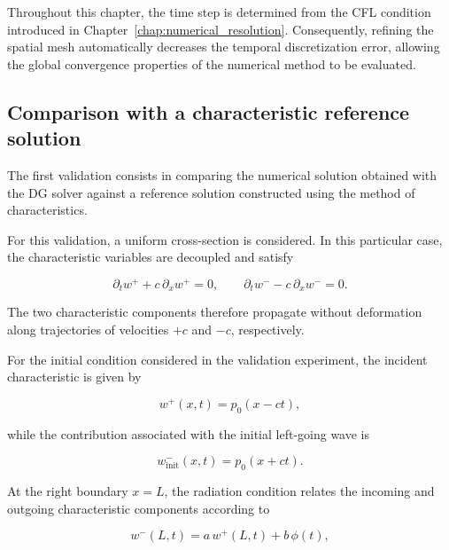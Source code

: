 \documentclass[11pt,a4paper]{report}
\theoremstyle{plain}
\theoremstyle{definition}
\begin{document}
Throughout this chapter, the time step is determined from the CFL condition
introduced in Chapter~\ref{chap:numerical_resolution}. Consequently, refining
the spatial mesh automatically decreases the temporal discretization error,
allowing the global convergence properties of the numerical method to be
evaluated.


\subsection{Comparison with a characteristic reference solution}

The first validation consists in comparing the numerical solution obtained
with the DG solver against a reference solution constructed using the method
of characteristics.

For this validation, a uniform cross-section is considered. In this particular
case, the characteristic variables are decoupled and satisfy

\begin{equation}
\partial_t w^+
+
c\,\partial_x w^+
=
0,
\qquad
\partial_t w^-
-
c\,\partial_x w^-
=
0.
\label{eq:uniform_characteristics}
\end{equation}

The two characteristic components therefore propagate without deformation
along trajectories of velocities \(+c\) and \(-c\), respectively.

For the initial condition considered in the validation experiment, the
incident characteristic is given by

\begin{equation}
w^+(x,t)
=
p_0(x-ct),
\label{eq:exact_wplus}
\end{equation}

while the contribution associated with the initial left-going wave is

\begin{equation}
w^-_{\mathrm{init}}(x,t)
=
p_0(x+ct).
\label{eq:exact_wminus_initial}
\end{equation}

At the right boundary \(x=L\), the radiation condition relates the incoming
and outgoing characteristic components according to

\begin{equation}
w^-(L,t)
=
a\,w^+(L,t)
+
b\,\phi(t),
\label{eq:exact_radiation_characteristic}
\end{equation}
\end{document}
